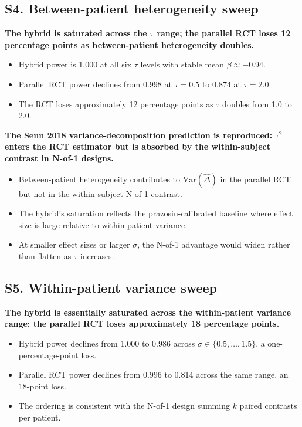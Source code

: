 \documentclass[
  11pt,
]{article}
\begin{document}
\subsection{S4. Between-patient heterogeneity sweep}\label{s4.-between-patient-heterogeneity-sweep}

\textbf{The hybrid is saturated across the $\tau$ range; the parallel RCT loses 12 percentage points as between-patient heterogeneity doubles.}

\begin{itemize}\setlength{\itemsep}{2pt}\setlength{\parskip}{0pt}
\item Hybrid power is 1.000 at all six $\tau$ levels with stable mean $\beta \approx -0.94$.
\item Parallel RCT power declines from 0.998 at $\tau = 0.5$ to 0.874 at $\tau = 2.0$.
\item The RCT loses approximately 12 percentage points as $\tau$ doubles from 1.0 to 2.0.
\end{itemize}

\textbf{The Senn 2018 variance-decomposition prediction is reproduced: $\tau^2$ enters the RCT estimator but is absorbed by the within-subject contrast in N-of-1 designs.}

\begin{itemize}\setlength{\itemsep}{2pt}\setlength{\parskip}{0pt}
\item Between-patient heterogeneity contributes to $\mathrm{Var}(\hat\Delta)$ in the parallel RCT but not in the within-subject N-of-1 contrast.
\item The hybrid's saturation reflects the prazosin-calibrated baseline where effect size is large relative to within-patient variance.
\item At smaller effect sizes or larger $\sigma$, the N-of-1 advantage would widen rather than flatten as $\tau$ increases.
\end{itemize}

\subsection{S5. Within-patient variance sweep}\label{s5.-within-patient-variance-sweep}

\textbf{The hybrid is essentially saturated across the within-patient variance range; the parallel RCT loses approximately 18 percentage points.}

\begin{itemize}\setlength{\itemsep}{2pt}\setlength{\parskip}{0pt}
\item Hybrid power declines from 1.000 to 0.986 across $\sigma \in \{0.5, \ldots, 1.5\}$, a one-percentage-point loss.
\item Parallel RCT power declines from 0.996 to 0.814 across the same range, an 18-point loss.
\item The ordering is consistent with the N-of-1 design summing $k$ paired contrasts per patient.
\end{itemize}
\end{document}
